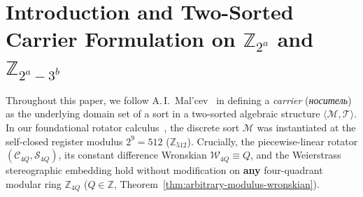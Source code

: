 \documentclass[11pt,a4paper]{article}
\theoremstyle{definition}
\theoremstyle{remark}
\begin{document}
\section{Introduction and Two-Sorted Carrier Formulation on $\mathbb{Z}_{2^a}$ and $\mathbb{Z}_{2^a - 3^b}$}
\label{sec:intro}

Throughout this paper, we follow A.\,I.~Mal'cev~\cite{Malcev1973} in defining a \emph{carrier} (\emph{носитель}) as the underlying domain set of a sort in a two-sorted algebraic structure $\langle\mathcal{M},\mathcal{T}\rangle$. In our foundational rotator calculus~\cite{KarataevRotator1}, the discrete sort $\mathcal{M}$ was instantiated at the self-closed register modulus $2^9 = 512$ ($\mathbb{Z}_{512}$). Crucially, the piecewise-linear rotator $(\mathcal{C}_{4Q},\mathcal{S}_{4Q})$, its constant difference Wronskian $\mathcal{W}_{4Q} \equiv Q$, and the Weierstrass stereographic embedding hold without modification on \textbf{any} four-quadrant modular ring $\mathbb{Z}_{4Q}$ ($Q\in\mathbb{Z}$, Theorem~\ref{thm:arbitrary-modulus-wronskian}).
\end{document}
